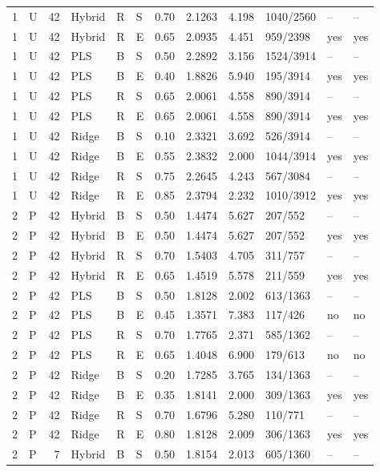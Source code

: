 \documentclass[10pt,a4paper]{article}
\begin{document}
\begin{longtable}{rlrlllrrrlll}
1 & U & 42 & Hybrid & R & S & 0.70 & 2.1263 & 4.198 & 1040/2560 & -- & -- \\
1 & U & 42 & Hybrid & R & E & 0.65 & 2.0935 & 4.451 & 959/2398 & yes & yes \\
1 & U & 42 & PLS & B & S & 0.50 & 2.2892 & 3.156 & 1524/3914 & -- & -- \\
1 & U & 42 & PLS & B & E & 0.40 & 1.8826 & 5.940 & 195/3914 & yes & yes \\
1 & U & 42 & PLS & R & S & 0.65 & 2.0061 & 4.558 & 890/3914 & -- & -- \\
1 & U & 42 & PLS & R & E & 0.65 & 2.0061 & 4.558 & 890/3914 & yes & yes \\
1 & U & 42 & Ridge & B & S & 0.10 & 2.3321 & 3.692 & 526/3914 & -- & -- \\
1 & U & 42 & Ridge & B & E & 0.55 & 2.3832 & 2.000 & 1044/3914 & yes & yes \\
1 & U & 42 & Ridge & R & S & 0.75 & 2.2645 & 4.243 & 567/3084 & -- & -- \\
1 & U & 42 & Ridge & R & E & 0.85 & 2.3794 & 2.232 & 1010/3912 & yes & yes \\
2 & P & 42 & Hybrid & B & S & 0.50 & 1.4474 & 5.627 & 207/552 & -- & -- \\
2 & P & 42 & Hybrid & B & E & 0.50 & 1.4474 & 5.627 & 207/552 & yes & yes \\
2 & P & 42 & Hybrid & R & S & 0.70 & 1.5403 & 4.705 & 311/757 & -- & -- \\
2 & P & 42 & Hybrid & R & E & 0.65 & 1.4519 & 5.578 & 211/559 & yes & yes \\
2 & P & 42 & PLS & B & S & 0.50 & 1.8128 & 2.002 & 613/1363 & -- & -- \\
2 & P & 42 & PLS & B & E & 0.45 & 1.3571 & 7.383 & 117/426 & no & no \\
2 & P & 42 & PLS & R & S & 0.70 & 1.7765 & 2.371 & 585/1362 & -- & -- \\
2 & P & 42 & PLS & R & E & 0.65 & 1.4048 & 6.900 & 179/613 & no & no \\
2 & P & 42 & Ridge & B & S & 0.20 & 1.7285 & 3.765 & 134/1363 & -- & -- \\
2 & P & 42 & Ridge & B & E & 0.35 & 1.8141 & 2.000 & 309/1363 & yes & yes \\
2 & P & 42 & Ridge & R & S & 0.70 & 1.6796 & 5.280 & 110/771 & -- & -- \\
2 & P & 42 & Ridge & R & E & 0.80 & 1.8128 & 2.009 & 306/1363 & yes & yes \\
2 & P & 7 & Hybrid & B & S & 0.50 & 1.8154 & 2.013 & 605/1360 & -- & -- \\

\end{longtable}
\end{document}
